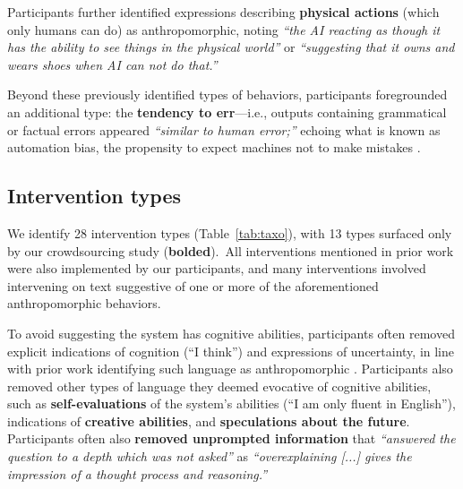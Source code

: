 \documentclass[11pt]{article}
\newcounter{intervention}  %
\newcommand{\cb}{behaviors}
\begin{document}
Participants further identified expressions describing \textbf{physical actions} (which only humans can do) as anthropomorphic, noting \textit{``the AI reacting as though it has the ability to see things in the physical world''} or \textit{``suggesting that it owns and wears shoes when AI can not do that.''} 


Beyond these previously identified types of behaviors, participants foregrounded 
an additional type: the \textbf{tendency to err}---i.e., outputs containing grammatical or factual errors appeared \textit{``similar to human error;''}
echoing what is known as automation bias, the propensity to expect machines not to make mistakes \cite{goddard2012automation}.



\subsection{Intervention types} 
We identify 28 intervention types (Table~\ref{tab:taxo}),
with 13 types surfaced only by our crowdsourcing study (\textbf{bolded}).~All interventions mentioned in prior work were also implemented by our participants, and many interventions involved intervening on text suggestive of one or more of the aforementioned anthropomorphic \cb.


To avoid suggesting the system has cognitive abilities, participants often removed explicit indications of cognition (``I think'') and expressions of uncertainty, in line with prior work identifying such language as anthropomorphic \cite{shneidermandumpty,Emnett2024-na,Inie2024-dy,Kim2024-sv,zhou-etal-2024-relying}. Participants also removed other types of language they deemed evocative of cognitive abilities, such as \textbf{self-evaluations} of the system's abilities (``I am only fluent in English''), indications of \textbf{creative abilities}, and \textbf{speculations about the future}. Participants often also \textbf{removed unprompted information} that \textit{``answered the question to a depth which was not asked''} as \textit{``overexplaining [...] gives the impression of a thought process and reasoning.''}
\end{document}
